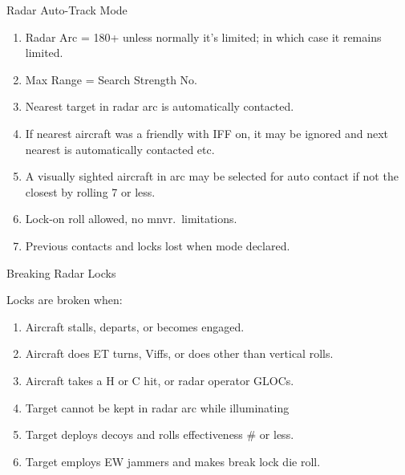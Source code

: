 \begin{table}
\centering
\caption{Radar Auto-Track Mode}
\medskip
\begin{minipage}{\linewidth}
\begin{enumerate}
    \item Radar Arc = 180+ unless normally it's limited; in which case it remains limited.
    \item Max Range = Search Strength No.
    \item Nearest target in radar arc is automatically contacted.
    \item If nearest aircraft was a friendly with IFF on, it may be ignored and next nearest is automatically contacted etc.
    \item A visually sighted aircraft in arc may be selected for auto contact if not the closest by rolling 7 or less.
    \item Lock-on roll allowed, no mnvr.\ limitations.
    \item Previous contacts and locks lost when mode declared.
\end{enumerate}
\end{minipage}
\end{table}

\begin{table}
\centering
\caption{Breaking Radar Locks}
\medskip
\begin{minipage}{\linewidth}
Locks are broken when:
\begin{enumerate}
    \item Aircraft stalls, departs, or becomes engaged.
    \item Aircraft does ET turns, Viffs, or does other than vertical rolls.
    \item Aircraft takes a H or C hit, or radar operator GLOCs.
    \item Target cannot be kept in radar arc while illuminating
    \item Target deploys decoys and rolls effectiveness \# or less.
    \item Target employs EW jammers and makes break lock die roll.
\end{enumerate}
\end{minipage}
\end{table}

